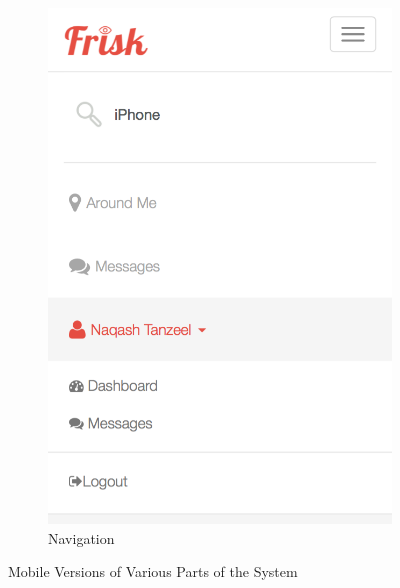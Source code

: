 \begin{figure}[H]
\begin{subfigure}[t]{0.3\textwidth}
		\includegraphics[width=1.0\textwidth]{images/Frisk/Mobile_Nav}
		\caption{Navigation}\label{fig:Mobile_Nav}
	\end{subfigure}
	\caption{Mobile Versions of Various Parts of the System}\label{fig:Mobile_View}
\end{figure}

\newpage